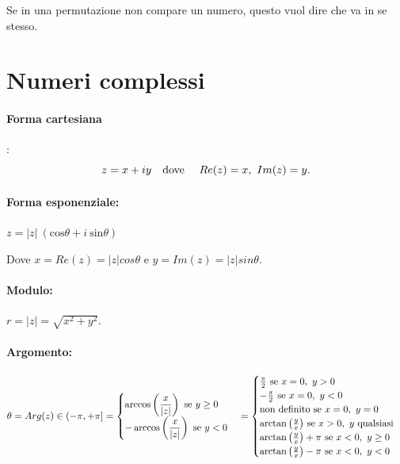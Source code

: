 \documentclass[a4paper]{article}
\begin{document}
        Se in una permutazione non compare un numero, questo vuol dire che va in se stesso.


        \section*{Numeri complessi}
        \paragraph{Forma cartesiana}:
        \[ z = x + iy \mbox{\quad dove \quad} Re(z) = x,\ Im(z) = y. \]


        \paragraph{Forma esponenziale:}
        $ z = |z| \ (\mbox{cos}\theta + i \ \mbox{sin}\theta)$

        Dove \quad $x = Re(z) = |z|cos\theta$ \quad e \quad $y = Im(z) = |z|sin\theta$.

        \paragraph{Modulo:}
        $ r = |z| = \sqrt{x^2 + y^2} $.

        \paragraph{Argomento:}
        $
                \theta = Arg(z) \in (-\pi,+\pi] =
                \begin{cases}
                        \arccos{\left( \mathlarger{\frac{x}{|z|}} \right) \mbox{ se } y \geq 0} \\
                        -\arccos{\left( \mathlarger{\frac{x}{|z|}} \right) \mbox{ se } y < 0} \\
                \end{cases} =
                \begin{cases}
                        \frac{\pi}{2} \mbox{ se } x = 0, \ y > 0 \\
                        -\frac{\pi}{2} \mbox{ se } x = 0, \ y < 0 \\
                        \mbox{non definito se } x = 0, \ y = 0 \\
                        \arctan{\left(\frac{y}{x}\right)} \mbox{ se } x > 0, \ y \mbox{ qualsiasi} \\
                        \arctan{\left(\frac{y}{x}\right)} + \pi \mbox{ se } x < 0, \ y \geq 0 \\
                        \arctan{\left(\frac{y}{x}\right)} - \pi \mbox{ se } x < 0, \ y < 0
                \end{cases}
        $
\end{document}
